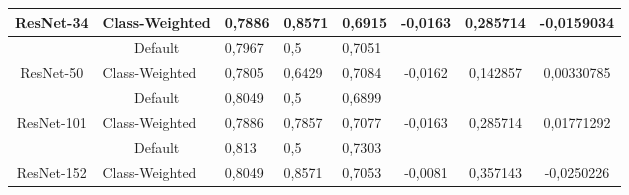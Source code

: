 \begin{table}[hbtp]
\begin{center}
\begin{tabular}{|c|c|lll|ccc|}
		\multirow{-2}{*}{ResNet-34}                          & \multicolumn{1}{l|}{Class-Weighted}                       & \multicolumn{1}{l|}{0,7886}  & \multicolumn{1}{l|}{0,8571} & 0,6915                   & \multicolumn{1}{c|}{\multirow{-2}{*}{-0,0163}} & \multicolumn{1}{c|}{\multirow{-2}{*}{0,285714}} & \multirow{-2}{*}{-0,0159034} \\ \hline
															 & Default                                                   & \multicolumn{1}{l|}{0,7967}  & \multicolumn{1}{l|}{0,5}    & 0,7051                   & \multicolumn{1}{c|}{}                          & \multicolumn{1}{c|}{}                           &                              \\ \cline{2-5}
		\multirow{-2}{*}{ResNet-50}                          & \multicolumn{1}{l|}{Class-Weighted}                       & \multicolumn{1}{l|}{0,7805}  & \multicolumn{1}{l|}{0,6429} & 0,7084                   & \multicolumn{1}{c|}{\multirow{-2}{*}{-0,0162}} & \multicolumn{1}{c|}{\multirow{-2}{*}{0,142857}} & \multirow{-2}{*}{0,00330785} \\ \hline
															 & Default                                                   & \multicolumn{1}{l|}{0,8049}  & \multicolumn{1}{l|}{0,5}    & 0,6899                   & \multicolumn{1}{c|}{}                          & \multicolumn{1}{c|}{}                           &                              \\ \cline{2-5}
		\multirow{-2}{*}{ResNet-101}                         & \multicolumn{1}{l|}{Class-Weighted}                       & \multicolumn{1}{l|}{0,7886}  & \multicolumn{1}{l|}{0,7857} & 0,7077                   & \multicolumn{1}{c|}{\multirow{-2}{*}{-0,0163}} & \multicolumn{1}{c|}{\multirow{-2}{*}{0,285714}} & \multirow{-2}{*}{0,01771292} \\ \hline
															 & Default                                                   & \multicolumn{1}{l|}{0,813}   & \multicolumn{1}{l|}{0,5}    & 0,7303                   & \multicolumn{1}{c|}{}                          & \multicolumn{1}{c|}{}                           &                              \\ \cline{2-5}
		\multirow{-2}{*}{ResNet-152}                         & \multicolumn{1}{l|}{Class-Weighted}                       & \multicolumn{1}{l|}{0,8049}  & \multicolumn{1}{l|}{0,8571} & 0,7053                   & \multicolumn{1}{c|}{\multirow{-2}{*}{-0,0081}} & \multicolumn{1}{c|}{\multirow{-2}{*}{0,357143}} & \multirow{-2}{*}{-0,0250226} \\ \hline
		\end{tabular}
	\end{center}
\end{table}

